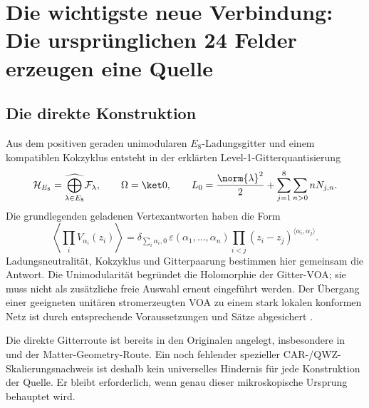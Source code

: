\section{Die wichtigste neue Verbindung: Die ursprünglichen 24 Felder erzeugen eine Quelle}\label{sec:source}

\subsection{Die direkte Konstruktion}
Aus dem positiven geraden unimodularen $E_8$-Ladungsgitter und einem kompatiblen Kokzyklus entsteht in der erklärten Level-1-Gitterquantisierung
\begin{equation}
\mathcal H_{E_8}=\widehat{\bigoplus_{\lambda\in E_8}}\mathcal F_\lambda,
\qquad \Omega=\ket0,
\qquad L_0=\frac{\norm{\lambda}^2}{2}+\sum_{j=1}^8\sum_{n>0}nN_{j,n}.
\end{equation}
Die grundlegenden geladenen Vertexantworten haben die Form
\begin{equation}
\left\langle\prod_i V_{\alpha_i}(z_i)\right\rangle
=\delta_{\sum_i\alpha_i,0}\,\varepsilon(\alpha_1,\ldots,\alpha_n)
\prod_{i<j}(z_i-z_j)^{\langle\alpha_i,\alpha_j\rangle}.
\end{equation}
Ladungsneutralität, Kokzyklus und Gitterpaarung bestimmen hier gemeinsam die Antwort. Die Unimodularität begründet die Holomorphie der Gitter-VOA; sie muss nicht als zusätzliche freie Auswahl erneut eingeführt werden. Der Übergang einer geeigneten unitären stromerzeugten VOA zu einem stark lokalen konformen Netz ist durch entsprechende Voraussetzungen und Sätze abgesichert \cite{cklw}.


Die direkte Gitterroute ist bereits in den Originalen angelegt, insbesondere in  und der Matter-Geometry-Route. Ein noch fehlender spezieller CAR-/QWZ-Skalierungsnachweis ist deshalb kein universelles Hindernis für jede Konstruktion der Quelle. Er bleibt erforderlich, wenn genau dieser mikroskopische Ursprung behauptet wird.

